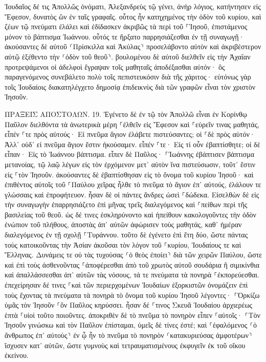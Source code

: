 \documentclass[twoside, 9pt]{extreport}
\begin{document}
Ἰουδαῖος δέ τις Ἀπολλῶς ὀνόματι, Ἀλεξανδρεὺς τῷ γένει, ἀνὴρ λόγιος, κατήντησεν εἰς Ἔφεσον, δυνατὸς ὢν ἐν ταῖς γραφαῖς. 
οὗτος ἦν κατηχημένος τὴν ὁδὸν τοῦ κυρίου, καὶ ζέων τῷ πνεύματι ἐλάλει καὶ ἐδίδασκεν ἀκριβῶς τὰ περὶ τοῦ ⸀Ἰησοῦ, ἐπιστάμενος μόνον τὸ βάπτισμα Ἰωάννου. 
οὗτός τε ἤρξατο παρρησιάζεσθαι ἐν τῇ συναγωγῇ· ἀκούσαντες δὲ αὐτοῦ ⸂Πρίσκιλλα καὶ Ἀκύλας⸃ προσελάβοντο αὐτὸν καὶ ἀκριβέστερον αὐτῷ ἐξέθεντο τὴν ⸂ὁδὸν τοῦ θεοῦ⸃. 
βουλομένου δὲ αὐτοῦ διελθεῖν εἰς τὴν Ἀχαΐαν προτρεψάμενοι οἱ ἀδελφοὶ ἔγραψαν τοῖς μαθηταῖς ἀποδέξασθαι αὐτόν· ὃς παραγενόμενος συνεβάλετο πολὺ τοῖς πεπιστευκόσιν διὰ τῆς χάριτος· 
εὐτόνως γὰρ τοῖς Ἰουδαίοις διακατηλέγχετο δημοσίᾳ ἐπιδεικνὺς διὰ τῶν γραφῶν εἶναι τὸν χριστὸν Ἰησοῦν. 

ΠΡΑΞΕΙΣ ΑΠΟΣΤΟΛΩΝ.
19.
Ἐγένετο δὲ ἐν τῷ τὸν Ἀπολλῶ εἶναι ἐν Κορίνθῳ Παῦλον διελθόντα τὰ ἀνωτερικὰ μέρη ⸀ἐλθεῖν εἰς Ἔφεσον καὶ ⸀εὑρεῖν τινας μαθητάς, 
εἶπέν ⸀τε πρὸς αὐτούς· Εἰ πνεῦμα ἅγιον ἐλάβετε πιστεύσαντες; οἱ ⸀δὲ πρὸς αὐτόν· Ἀλλ᾽ οὐδ᾽ εἰ πνεῦμα ἅγιον ἔστιν ἠκούσαμεν. 
εἶπέν ⸀τε· Εἰς τί οὖν ἐβαπτίσθητε; οἱ δὲ εἶπαν· Εἰς τὸ Ἰωάννου βάπτισμα. 
εἶπεν δὲ Παῦλος· ⸀Ἰωάννης ἐβάπτισεν βάπτισμα μετανοίας, τῷ λαῷ λέγων εἰς τὸν ἐρχόμενον μετ᾽ αὐτὸν ἵνα πιστεύσωσιν, τοῦτ᾽ ἔστιν εἰς ⸀τὸν Ἰησοῦν. 
ἀκούσαντες δὲ ἐβαπτίσθησαν εἰς τὸ ὄνομα τοῦ κυρίου Ἰησοῦ· 
καὶ ἐπιθέντος αὐτοῖς τοῦ ⸀Παύλου χεῖρας ἦλθε τὸ πνεῦμα τὸ ἅγιον ἐπ᾽ αὐτούς, ἐλάλουν τε γλώσσαις καὶ ἐπροφήτευον. 
ἦσαν δὲ οἱ πάντες ἄνδρες ὡσεὶ ⸀δώδεκα. 
Εἰσελθὼν δὲ εἰς τὴν συναγωγὴν ἐπαρρησιάζετο ἐπὶ μῆνας τρεῖς διαλεγόμενος καὶ ⸀πείθων περὶ τῆς βασιλείας τοῦ θεοῦ. 
ὡς δέ τινες ἐσκληρύνοντο καὶ ἠπείθουν κακολογοῦντες τὴν ὁδὸν ἐνώπιον τοῦ πλήθους, ἀποστὰς ἀπ᾽ αὐτῶν ἀφώρισεν τοὺς μαθητάς, καθ᾽ ἡμέραν διαλεγόμενος ἐν τῇ σχολῇ ⸀Τυράννου. 
τοῦτο δὲ ἐγένετο ἐπὶ ἔτη δύο, ὥστε πάντας τοὺς κατοικοῦντας τὴν Ἀσίαν ἀκοῦσαι τὸν λόγον τοῦ ⸀κυρίου, Ἰουδαίους τε καὶ Ἕλληνας. 
Δυνάμεις τε οὐ τὰς τυχούσας ⸂ὁ θεὸς ἐποίει⸃ διὰ τῶν χειρῶν Παύλου, 
ὥστε καὶ ἐπὶ τοὺς ἀσθενοῦντας ⸀ἀποφέρεσθαι ἀπὸ τοῦ χρωτὸς αὐτοῦ σουδάρια ἢ σιμικίνθια καὶ ἀπαλλάσσεσθαι ἀπ᾽ αὐτῶν τὰς νόσους, τά τε πνεύματα τὰ πονηρὰ ⸀ἐκπορεύεσθαι. 
ἐπεχείρησαν δέ τινες ⸀καὶ τῶν περιερχομένων Ἰουδαίων ἐξορκιστῶν ὀνομάζειν ἐπὶ τοὺς ἔχοντας τὰ πνεύματα τὰ πονηρὰ τὸ ὄνομα τοῦ κυρίου Ἰησοῦ λέγοντες· ⸀Ὁρκίζω ὑμᾶς τὸν Ἰησοῦν ⸀ὃν Παῦλος κηρύσσει. 
ἦσαν δέ ⸀τινος Σκευᾶ Ἰουδαίου ἀρχιερέως ἑπτὰ ⸀υἱοὶ τοῦτο ποιοῦντες. 
ἀποκριθὲν δὲ τὸ πνεῦμα τὸ πονηρὸν εἶπεν ⸀αὐτοῖς· ⸀Τὸν Ἰησοῦν γινώσκω καὶ τὸν Παῦλον ἐπίσταμαι, ὑμεῖς δὲ τίνες ἐστέ; 
καὶ ⸀ἐφαλόμενος ⸂ὁ ἄνθρωπος ἐπ᾽ αὐτοὺς⸃ ἐν ᾧ ἦν τὸ πνεῦμα τὸ πονηρὸν ⸂κατακυριεύσας ἀμφοτέρων⸃ ἴσχυσεν κατ᾽ αὐτῶν, ὥστε γυμνοὺς καὶ τετραυματισμένους ἐκφυγεῖν ἐκ τοῦ οἴκου ἐκείνου. 
\end{document}
